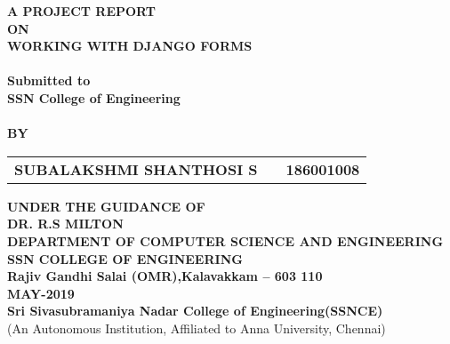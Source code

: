 \newpage
\begin{center}
\thispagestyle{empty}

\Large{\textbf{A PROJECT REPORT\\ \large{ON}}}\\[0.7cm]
\LARGE{\textsc {\textbf{WORKING WITH DJANGO FORMS}}}\\[0.5cm]
\vspace{0.5cm}
\Large{\textbf{\\Submitted to}}
\LARGE{\textbf{\\SSN College of Engineering\\}}
\vspace{1cm}
\Large{\textbf{\\BY}}\\[0.5cm]
\begin{table}[h]
\centering
\Large{
\begin{tabular}{>{\bfseries}lc>{\bfseries}r}
SUBALAKSHMI SHANTHOSI S & & 186001008 \\
\end{tabular}}
\end{table}
\vspace{0.5cm}
\large{\textbf{UNDER THE GUIDANCE OF}}\\
\large{\textbf{DR. R.S MILTON}}\\
\vspace{1cm}
\large{\textbf{DEPARTMENT OF COMPUTER SCIENCE AND ENGINEERING}}\\
\Large{\textbf{SSN COLLEGE OF ENGINEERING}}\\
\vspace{0.5cm}
\large{\textbf{Rajiv Gandhi Salai (OMR),Kalavakkam -- 603 110 }}
\large{\textbf{\\MAY-2019}}\\
\vspace{1cm}
\Large{\textbf{Sri Sivasubramaniya Nadar College of Engineering(SSNCE)\\}}
(An Autonomous Institution, Affiliated to Anna University, Chennai)\\
\newpage
\end{center}